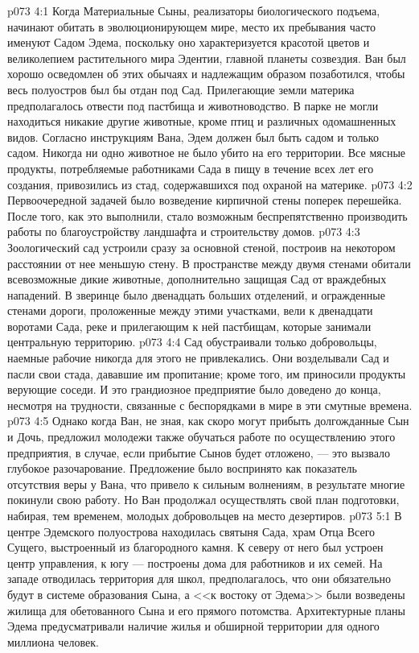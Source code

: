 \vs p073 4:1 Когда Материальные Сыны, реализаторы биологического подъема, начинают обитать в эволюционирующем мире, место их пребывания часто именуют Садом Эдема, поскольку оно характеризуется красотой цветов и великолепием растительного мира Эдентии, главной планеты созвездия. Ван был хорошо осведомлен об этих обычаях и надлежащим образом позаботился, чтобы весь полуостров был бы отдан под Сад. Прилегающие земли материка предполагалось отвести под пастбища и животноводство. В парке не могли находиться никакие другие животные, кроме птиц и различных одомашненных видов. Согласно инструкциям Вана, Эдем должен был быть садом и только садом. Никогда ни одно животное не было убито на его территории. Все мясные продукты, потребляемые работниками Сада в пищу в течение всех лет его создания, привозились из стад, содержавшихся под охраной на материке.
\vs p073 4:2 Первоочередной задачей было возведение кирпичной стены поперек перешейка. После того, как это выполнили, стало возможным беспрепятственно производить работы по благоустройству ландшафта и строительству домов.
\vs p073 4:3 Зоологический сад устроили сразу за основной стеной, построив на некотором расстоянии от нее меньшую стену. В пространстве между двумя стенами обитали всевозможные дикие животные, дополнительно защищая Сад от враждебных нападений. В зверинце было двенадцать больших отделений, и огражденные стенами дороги, проложенные между этими участками, вели к двенадцати воротами Сада, реке и прилегающим к ней пастбищам, которые занимали центральную территорию.
\vs p073 4:4 Сад обустраивали только добровольцы, наемные рабочие никогда для этого не привлекались. Они возделывали Сад и пасли свои стада, дававшие им пропитание; кроме того, им приносили продукты верующие соседи. И это грандиозное предприятие было доведено до конца, несмотря на трудности, связанные с беспорядками в мире в эти смутные времена.
\vs p073 4:5 Однако когда Ван, не зная, как скоро могут прибыть долгожданные Сын и Дочь, предложил молодежи также обучаться работе по осуществлению этого предприятия, в случае, если прибытие Сынов будет отложено, --- это вызвало глубокое разочарование. Предложение было воспринято как показатель отсутствия веры у Вана, что привело к сильным волнениям, в результате многие покинули свою работу. Но Ван продолжал осуществлять свой план подготовки, набирая, тем временем, молодых добровольцев на место дезертиров.
\vs p073 5:1 В центре Эдемского полуострова находилась святыня Сада, храм Отца Всего Сущего, выстроенный из благородного камня. К северу от него был устроен центр управления, к югу --- построены дома для работников и их семей. На западе отводилась территория для школ, предполагалось, что они обязательно будут в системе образования Сына, а <<к востоку от Эдема>> были возведены жилища для обетованного Сына и его прямого потомства. Архитектурные планы Эдема предусматривали наличие жилья и обширной территории для одного миллиона человек.
